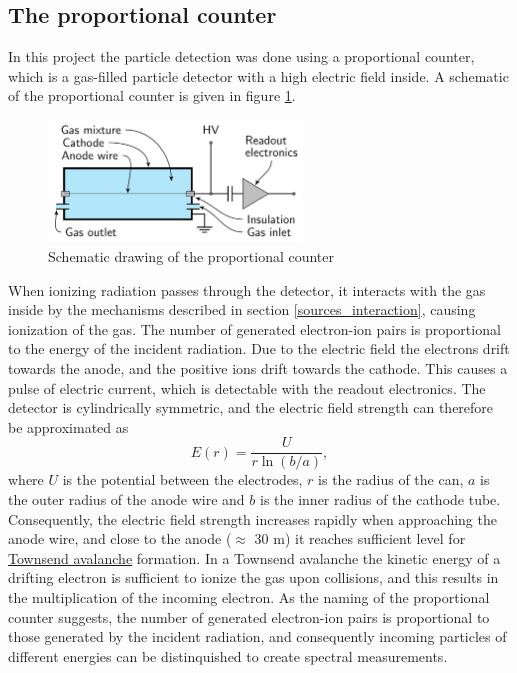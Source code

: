 \documentclass[a4paper]{article}
\begin{document}
\subsection{The proportional counter}
\label{counter}

In this project the particle detection was done using a proportional counter, which is a gas-filled particle detector with a high electric field inside.
\cite{instructions}
A schematic of the proportional counter is given in figure \ref{fig:theory_schematic}.

\begin{figure}[ht!]
\centering
\includegraphics[width=0.6\textwidth]{fig/article/schematic.png}
\caption{Schematic drawing of the proportional counter \cite{winkler_gaseous_2015}}
\label{fig:theory_schematic}
\end{figure}

When ionizing radiation passes through the detector, it interacts with the gas inside by the mechanisms described in section \ref{sources_interaction}, causing ionization of the gas.
The number of generated electron-ion pairs is proportional to the energy of the incident radiation.
Due to the electric field the electrons drift towards the anode, and the positive ions drift towards the cathode.
This causes a pulse of electric current, which is detectable with the readout electronics.
The detector is cylindrically symmetric, and the electric field strength can therefore be approximated as
\begin{equation}
E(r) = \frac{U}{r \ln(b/a) },
\end{equation}
where $U$ is the potential between the electrodes, $r$ is the radius of the can, $a$ is the outer radius of the anode wire and $b$ is the inner radius of the cathode tube.
Consequently, the electric field strength increases rapidly when approaching the anode wire, and close to the anode ($\approx$ 30 \textmu m) it reaches sufficient level for
\href{https://en.wikipedia.org/wiki/Townsend_discharge}{Townsend avalanche} formation.
In a Townsend avalanche the kinetic energy of a drifting electron is sufficient to ionize the gas upon collisions, and this results in the multiplication of the incoming electron.
As the naming of the proportional counter suggests, the number of generated electron-ion pairs is proportional to those generated by the incident radiation, and consequently incoming particles of different energies can be distinquished to create spectral measurements.
\cites{winkler_gaseous_2015}[p. 159--164]{knoll_radiation_2010}
\end{document}
